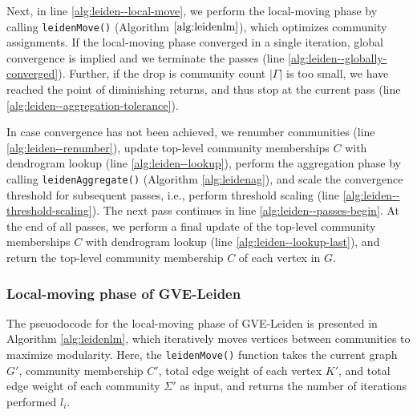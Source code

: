 Next, in line \ref{alg:leiden--local-move}, we perform the local-moving phase by calling \texttt{leidenMove()} (Algorithm $\ref{alg:leidenlm}$), which optimizes community assignments. If the local-moving phase converged in a single iteration, global convergence is implied and we terminate the passes (line \ref{alg:leiden--globally-converged}). Further, if the drop is community count $|\Gamma|$ is too small, we have reached the point of diminishing returns, and thus stop at the current pass (line \ref{alg:leiden--aggregation-tolerance}).

In case convergence has not been achieved, we renumber communities (line \ref{alg:leiden--renumber}), update top-level community memberships $C$ with dendrogram lookup (line \ref{alg:leiden--lookup}), perform the aggregation phase by calling \texttt{leidenAggregate()} (Algorithm \ref{alg:leidenag}), and scale the convergence threshold for subsequent passes, i.e., perform threshold scaling (line \ref{alg:leiden--threshold-scaling}). The next pass continues in line \ref{alg:leiden--passes-begin}. At the end of all passes, we perform a final update of the top-level community memberships $C$ with dendrogram lookup (line \ref{alg:leiden--lookup-last}), and return the top-level community membership $C$ of each vertex in $G$.






\subsubsection{Local-moving phase of GVE-Leiden}

The pseuodocode for the local-moving phase of GVE-Leiden is presented in Algorithm \ref{alg:leidenlm}, which iteratively moves vertices between communities to maximize modularity. Here, the \texttt{leidenMove()} function takes the current graph $G'$, community membership $C'$, total edge weight of each vertex $K'$, and total edge weight of each community $\Sigma'$ as input, and returns the number of iterations performed $l_i$.

